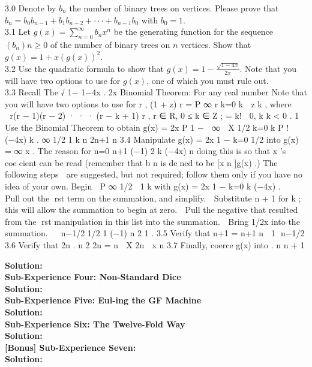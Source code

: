 \documentclass[10pt,a4paper]{report}
\begin{document}
	3.0 Denote by $b_n$ the number of binary trees on vertices. Please prove that $b_n = b_0 b_{n−1} + b_1b_{n−2} + · · · + b_{n−1}b_0$ with $b_0 = 1$.\\
	3.1 Let $g(x) = \sum_{n=0}^{\infty }b_nx^n$ be the generating function for the sequence $(b_n) n≥0$ of the number of binary trees on $n$ vertices. Show that $g(x) = 1 + x(g(x))^2$.\\
	3.2 Use the quadratic formula to show that $g(x) = 1-\frac{\sqrt{1-4x}}{2x}$. Note that you will have two options to use for $g(x)$, one of which you must rule out.\\
	3.3 Recall The
	√
	1− 1−4x
	.
	2x
	Binomial Theorem: For any real number
	Note that you will have two options to use for
	r , (1 + z) r =
	P ∞
	r
	k=0 k
	
	z k ,
	where
	
	   r(r − 1)(r − 2) · · · (r − k + 1)
	r
	, r ∈ R, 0 ≤ k ∈ Z ;
	=
	k!
	 0,
	k
	k < 0 .
	1
	Use the Binomial Theorem to obtain g(x) =
	2x
	P
	1 −
	
	∞ 
	X
	1/2
	k=0
	k
	P
	!
	(−4x)
	k
	.
	∞
	1/2
	1
	k
	n 2n+1 n
	3.4 Manipulate g(x) = 2x
	1 − k=0 1/2
	into g(x) = ∞
	x . The reason for
	n=0 n+1 (−1) 2
	k (−4x)
	n
	doing this is so that x 's coecient can be read (remember that b n is dened to be [x n ]g(x) .) The
	following steps  are suggested, but not required;
	follow them only if you have no idea of your own. Begin
	
	P ∞ 1/2 
	1
	k
	with g(x) = 2x 1 − k=0 k (−4x) .
	
	
	
	
	 Pull out the rst term on the summation, and simplify.
	 Substitute n + 1 for k ; this will allow the summation to begin at zero.
	 Pull the negative that resulted from the rst manipulation in this list into the summation.
	 Bring 1/2x into the summation.
	
	
	n−1/2
	1/2
	1
	(−1) n 2 1 .
	3.5 Verify that n+1
	= n+1
	n
	 1
	
	n−1/2
	3.6 Verify that 2n
	.
	n 2 2n =
	n
	
	X 2n  x n
	3.7 Finally, coerce g(x) into
	.
	n n + 1
	
	\textbf{Solution: }\\
	\newline
	\textbf{Sub-Experience Four: Non-Standard Dice}\\
	
	\textbf{Solution: }\\
	\newline
	\textbf{Sub-Experience Five: Eul-ing the GF Machine}\\
	
	\textbf{Solution: }\\
	\newline
	\textbf{Sub-Experience Six: The Twelve-Fold Way}\\
	
	\textbf{Solution: }\\
	\newline
	\textbf{[Bonus] Sub-Experience Seven:}\\	
	
	\textbf{Solution: }\\
	\newline
\end{document}
